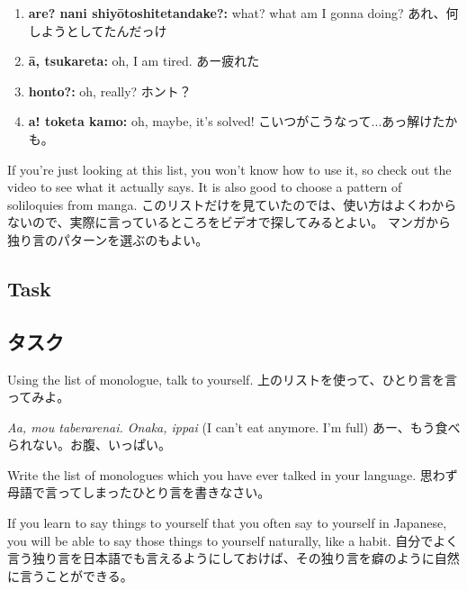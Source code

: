 \documentclass[uplatex,dvipdfmx,b5paper,english,10pt]{jsbook}
\begin{document}
\begin{enumerate}
\item \ifEnglish
      {\bfseries are? nani shiy\=otoshitetandake?:} what? what am I gonna doing?
      \else
      あれ、何しようとしてたんだっけ
      \fi
 \item \ifEnglish
       {\bfseries \=a, tsukareta:} oh, I am tired.
       \else
       あー疲れた
       \fi
 \item \ifEnglish
       {\bfseries honto?:} oh, really?
       \else
       ホント？
       \fi
 \item \ifEnglish
       {\bfseries a! toketa kamo:} oh, maybe, it's solved!
       \else
       こいつがこうなって...あっ解けたかも。
       \fi
\end{enumerate}

\begin{toianswer}
\ifEnglish
If you're just looking at this list, you won't know how to use it, so check out the video to see what it actually says.
It is also good to choose a pattern of soliloquies from manga.
\else
このリストだけを見ていたのでは、使い方はよくわからないので、実際に言っているところをビデオで探してみるとよい。
マンガから独り言のパターンを選ぶのもよい。
\fi
\end{toianswer}


\ifEnglish
\subsection{Task}
\else
\subsection{タスク}
\fi

\begin{toiquestion}
\ifEnglish
Using the list of monologue, talk to yourself.
\else
上のリストを使って、ひとり言を言ってみよ。
\fi
\end{toiquestion}
\begin{toianswer}
\ifEnglish
{\it Aa, mou taberarenai. Onaka, ippai\/} (I can't eat anymore. I'm full)
\else
あー、もう食べられない。お腹、いっぱい。
\fi
\end{toianswer}


\begin{toiquestion}
\ifEnglish
Write the list of monologues which you have ever talked in your language.
\else
思わず母語で言ってしまったひとり言を書きなさい。
\fi
\end{toiquestion}
\begin{toianswer}
\ifEnglish
If you learn to say things to yourself that you often say to yourself in Japanese, you will be able to say those things to yourself naturally, like a habit.
\else
自分でよく言う独り言を日本語でも言えるようにしておけば、その独り言を癖のように自然に言うことができる。
\fi
\end{toianswer}
\end{document}
